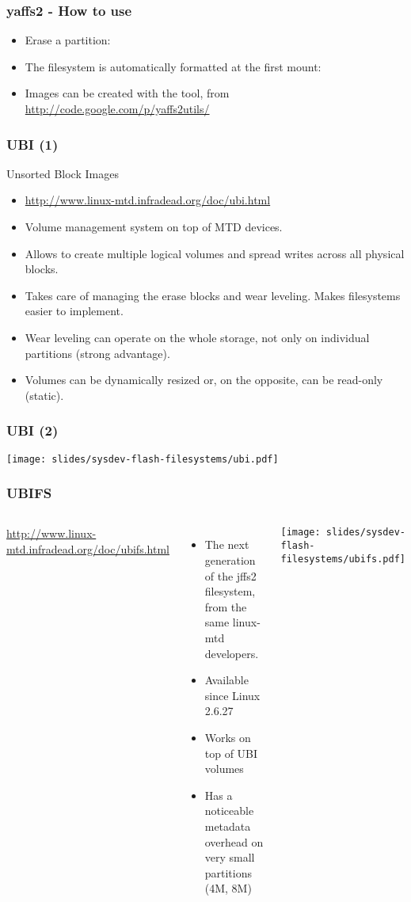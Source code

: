 \begin{frame}
  \frametitle{yaffs2 - How to use}
  \begin{itemize}
  \item Erase a partition:\\
  \item The filesystem is automatically formatted at the first mount:\\
  \item Images can be created with the  tool, from \\
    \url{http://code.google.com/p/yaffs2utils/}
  \end{itemize}
\end{frame}

\begin{frame}
  \frametitle{UBI (1)}
  Unsorted Block Images
  \begin{itemize}
  \item \url{http://www.linux-mtd.infradead.org/doc/ubi.html}
  \item Volume management system on top of MTD devices.
  \item Allows to create multiple logical volumes and spread writes
    across all physical blocks.
  \item Takes care of managing the erase blocks and wear
    leveling. Makes filesystems easier to implement.
  \item Wear leveling can operate on the whole storage,
    not only on individual partitions (strong advantage). 
  \item Volumes can be dynamically resized or, on the opposite, can be
    read-only (static).
  \end{itemize}
\end{frame}

\begin{frame}
  \frametitle{UBI (2)}
  \begin{center}
    \texttt{[image: slides/sysdev-flash-filesystems/ubi.pdf]}
  \end{center}
\end{frame}

\begin{frame}
  \frametitle{UBIFS}
  \begin{columns}
    \url{http://www.linux-mtd.infradead.org/doc/ubifs.html}
    \begin{itemize}
    \item The next generation of the jffs2 filesystem, from the same
      linux-mtd developers.
    \item Available since Linux 2.6.27
    \item Works on top of UBI volumes
    \item Has a noticeable metadata overhead on very small partitions
      (4M, 8M)
    \end{itemize}
    \texttt{[image: slides/sysdev-flash-filesystems/ubifs.pdf]}
  \end{columns}
\end{frame}


